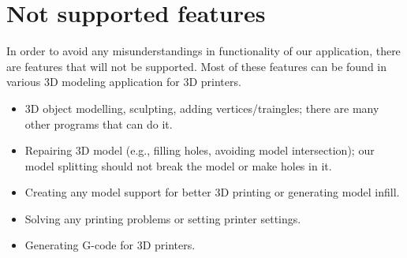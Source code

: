 \section{Not supported features}

In order to avoid any misunderstandings in functionality of our application, there are features that will not be supported. Most of these features can be found in various 3D modeling application for 3D printers.

\begin{itemize}
\item 3D object modelling, sculpting, adding vertices/traingles; there are many other programs that can do it.
\item Repairing 3D model (e.g., filling holes, avoiding model intersection); our model splitting should not break the model or make holes in it.
\item Creating any model support for better 3D printing or generating model infill.
\item Solving any printing problems or setting printer settings.
\item Generating G-code for 3D printers.
\end{itemize}










